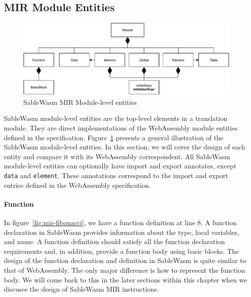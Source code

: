 \subsection{MIR Module Entities}

\begin{figure}
  \centering
  \includegraphics[width=\textwidth]{Images/4.MIR/module.pdf}
  \caption{SableWasm MIR Module-level entities}
  \label{fig:sablewasm-mir-module}
\end{figure}

SableWasm module-level entities are the top-level elements in a translation
module. They are direct implementations of the WebAssembly module entities
defined in the specification. Figure~\ref{fig:sablewasm-mir-module} presents a
general illustration of the SableWasm module-level entities. In this section,
we will cover the design of each entity and compare it with its WebAssembly
correspondent. All SableWasm module-level entities can optionally have import
and export annotates, except \texttt{data} and \texttt{element}. These
annotations correspond to the import and export entries defined in the
WebAssembly specification.

\paragraph{Function}
In figure~\ref{fig:mir-fibonacci}, we have a function definition at line 8. A
function declaration in SableWasm provides information about the type, local
variables, and name. A function definition should satisfy all the function
declaration requirements and, in addition, provide a function body using basic
blocks. The design of the function declaration and definition in SableWasm is
quite similar to that of WebAssembly. The only major difference is how to
represent the function body. We will come back to this in the later sections
within this chapter when we discuses the design of SableWasm MIR instructions.

